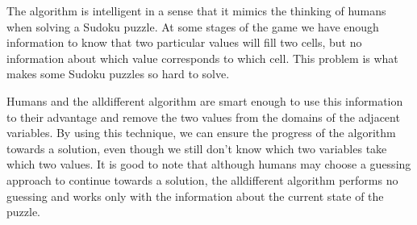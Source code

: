 \documentclass{l4proj}
\begin{document}
\noindent The algorithm is intelligent in a sense that it mimics the thinking of humans when solving a Sudoku puzzle. At some stages of the game we have enough information to know that two particular values will fill two cells, but no information about which value corresponds to which cell. This problem is what makes some Sudoku puzzles so hard to solve.

\noindent Humans and the alldifferent algorithm are smart enough to use this information to their advantage and remove the two values from the domains of the adjacent variables. By using this technique, we can ensure the progress of the algorithm towards a solution, even though we still don’t know which two variables take which two values. It is good to note that although humans may choose a guessing approach to continue towards a solution, the alldifferent algorithm performs no guessing and works only with the information about the current state of the puzzle.
\end{document}
